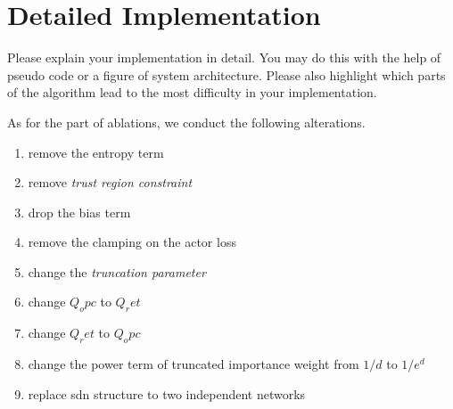 \section{Detailed Implementation}
\label{section:implementation}
Please explain your implementation in detail. You may do this with the help of pseudo code or a figure of system architecture. Please also highlight which parts of the algorithm lead to the most difficulty in your implementation.


As for the part of ablations, we conduct the following alterations. 

\begin{enumerate}
    \item remove the entropy term
    \item remove \emph{trust region constraint}
    \item drop the bias term 
    \item remove the clamping on the actor loss
    \item change the \emph{truncation parameter}
    \item change $Q_opc$ to $Q_ret$ 
    \item change $Q_ret$ to $Q_opc$
    \item change the power term of truncated importance weight from $1/d$ to $1 / e^d$
    \item replace sdn structure to two independent networks
\end{enumerate}



